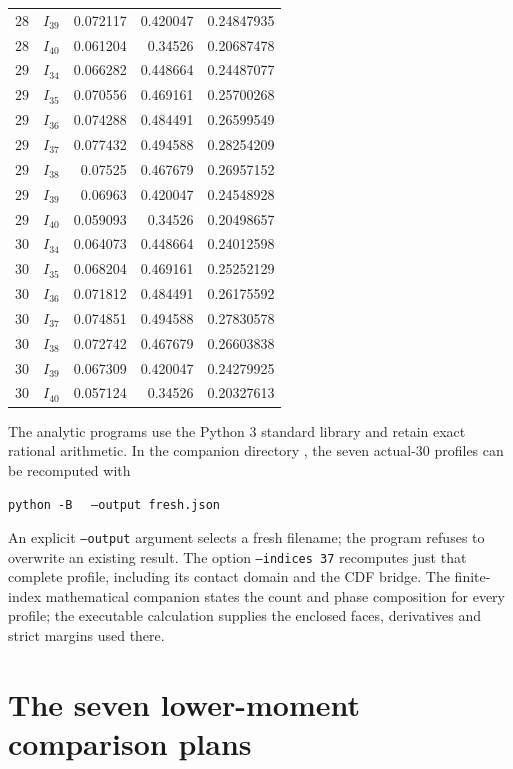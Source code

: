 \documentclass[aop,preprint]{imsart}
\theoremstyle{definition}
\numberwithin{equation}{section}
\begin{document}
\begin{longtable}{ccrrr}
$28$ & $I_{39}$ & 0.072117 & 0.420047 & 0.24847935\\
$28$ & $I_{40}$ & 0.061204 & 0.34526 & 0.20687478\\
\addlinespace
$29$ & $I_{34}$ & 0.066282 & 0.448664 & 0.24487077\\
$29$ & $I_{35}$ & 0.070556 & 0.469161 & 0.25700268\\
$29$ & $I_{36}$ & 0.074288 & 0.484491 & 0.26599549\\
$29$ & $I_{37}$ & 0.077432 & 0.494588 & 0.28254209\\
$29$ & $I_{38}$ & 0.07525 & 0.467679 & 0.26957152\\
$29$ & $I_{39}$ & 0.06963 & 0.420047 & 0.24548928\\
$29$ & $I_{40}$ & 0.059093 & 0.34526 & 0.20498657\\
\addlinespace
$30$ & $I_{34}$ & 0.064073 & 0.448664 & 0.24012598\\
$30$ & $I_{35}$ & 0.068204 & 0.469161 & 0.25252129\\
$30$ & $I_{36}$ & 0.071812 & 0.484491 & 0.26175592\\
$30$ & $I_{37}$ & 0.074851 & 0.494588 & 0.27830578\\
$30$ & $I_{38}$ & 0.072742 & 0.467679 & 0.26603838\\
$30$ & $I_{39}$ & 0.067309 & 0.420047 & 0.24279925\\
$30$ & $I_{40}$ & 0.057124 & 0.34526 & 0.20327613\\
\bottomrule\end{longtable}\endgroup
The analytic programs use the Python 3 standard library and retain
exact rational arithmetic. In the companion directory
, the seven actual-$30$
profiles can be recomputed with
\par\noindent\texttt{python -B}\ 
\ \texttt{--output fresh.json}\par
An explicit \texttt{--output} argument selects a fresh filename;
the program refuses to overwrite an existing result.
The option \texttt{--indices 37} recomputes just that complete
profile, including its contact domain and the CDF bridge.
The finite-index mathematical companion states the count and phase
composition for every profile; the executable calculation supplies
the enclosed faces, derivatives and strict margins used there.

\section{The seven lower-moment comparison plans}\label{app:finite-details}
\end{document}
